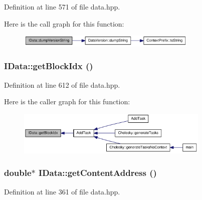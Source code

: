 Definition at line 571 of file data.hpp.

Here is the call graph for this function:\nopagebreak
\begin{figure}[H]
\begin{center}
\leavevmode
\includegraphics[width=244pt]{class_i_data_ae7530342c87faddc0e0042990b15dcc5_cgraph}
\end{center}
\end{figure}
\hypertarget{class_i_data_afe763d3746eda6f5814b162455abd8e5}{
\subsubsection[{getBlockIdx}]{ IData::getBlockIdx ()}}
\label{class_i_data_afe763d3746eda6f5814b162455abd8e5}


Definition at line 612 of file data.hpp.

Here is the caller graph for this function:\nopagebreak
\begin{figure}[H]
\begin{center}
\leavevmode
\includegraphics[width=260pt]{class_i_data_afe763d3746eda6f5814b162455abd8e5_icgraph}
\end{center}
\end{figure}
\hypertarget{class_i_data_a513a1ad05e427af81ca7c34291826efb}{
\subsubsection[{getContentAddress}]{\setlength{\rightskip}{0pt plus 5cm}double$\ast$ IData::getContentAddress ()}}
\label{class_i_data_a513a1ad05e427af81ca7c34291826efb}


Definition at line 361 of file data.hpp.

